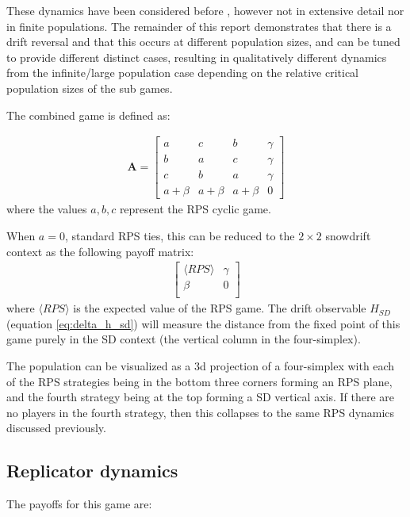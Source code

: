 \documentclass[%
 reprint,
 amsmath,amssymb,
 aps,
]{revtex4-2}
\begin{document}
These dynamics have been considered before \cite{evolution_pop_dynamics}, 
however not in extensive detail nor in finite populations. 
The remainder of this report demonstrates that there 
is a drift reversal and that this occurs at different population sizes, 
and can be tuned to provide different distinct cases, 
resulting in qualitatively different dynamics from the infinite/large 
population case depending on the relative critical population sizes of the sub games. 


The combined game is defined as:

\begin{align}
\label{AugRpsMatrix}
\mathbf{A} =
\begin{bmatrix}
    a & c & b & \gamma\\
    b & a & c & \gamma\\
    c & b & a & \gamma\\
    a + \beta & a + \beta & a + \beta & 0
\end{bmatrix}
\end{align}
where the values $a,b,c$ represent the RPS cyclic game.

When $a = 0$, standard RPS ties, this can be reduced to the $2 \times 2$ snowdrift context as the following
payoff matrix:
\begin{align} \nonumber
\label{CompositeGame}
\begin{bmatrix}
    \langle RPS \rangle & \gamma\\
    \beta & 0 \\
\end{bmatrix}
\end{align}
where $\langle RPS \rangle$ is the expected value of the RPS game.
The drift observable $H_{SD}$ (equation \ref{eq:delta_h_sd}) will measure the distance
from the fixed point of this game purely in the SD context (the vertical column in the 
four-simplex).

The population can be visualized as a 3d projection of a four-simplex 
with each of the RPS strategies being in the bottom three corners forming an 
RPS plane, and the fourth strategy being at the top forming a SD vertical axis.
If there are no players in the fourth strategy, then this collapses to the 
same RPS dynamics discussed previously.

\subsection{Replicator dynamics}

The payoffs for this game are:
\end{document}
